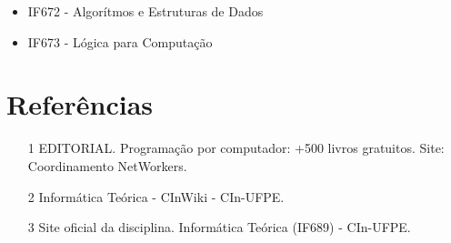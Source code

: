 \documentclass{article}
\begin{document}
    
\begin{itemize}
\item  IF672 - Algorítmos e Estruturas de Dados
\item  IF673 - Lógica para Computação
\end{itemize}

    
    
\section{Referências}

\begin{itemize}
\item [1] EDITORIAL. Programação por computador: +500 livros gratuitos. Site: Coordinamento NetWorkers.

\item [2] Informática Teórica - CInWiki - CIn-UFPE.

\item [3] Site oficial da disciplina. Informática Teórica (IF689) - CIn-UFPE.
\end{itemize}
\end{document}
